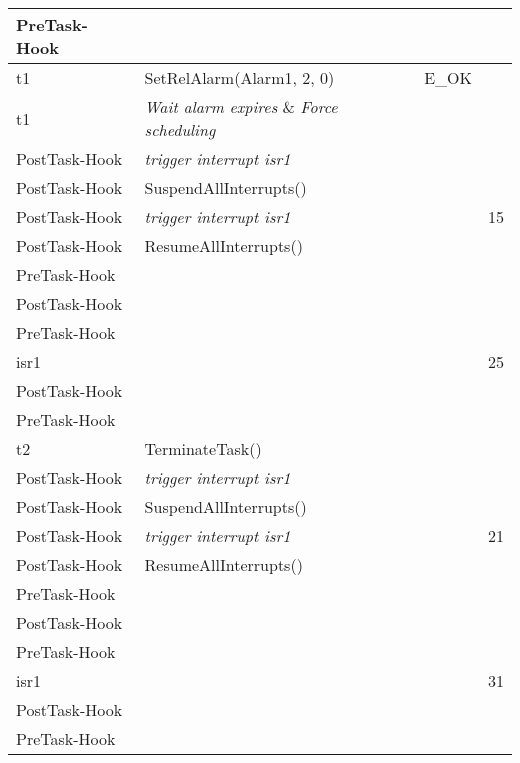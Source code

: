 \documentclass[10pt]{article}
\newlength{\Li}\settowidth{\Li}{Running}
\newlength{\Lii}\setlength{\Lii}{7cm}
\newlength{\Liiii}\setlength{\Liiii}{0.9cm}
\newlength{\Liii}\setlength{\Liii}{\textwidth} \addtolength{\Liii}{-\Li} \addtolength{\Liii}{-\Lii} \addtolength{\Liii}{-\Liiii}
\begin{document}
	\begin{supertabular}{|p{\Li}|p{\Lii}|p{\Liii}|p{\Liiii}|} \hline
	PreTask-Hook	&										&				& \\ \hline
	
	t1			& SetRelAlarm(Alarm1, 2, 0)					& E\_OK			& \\ \hline
	t1			& \textit{Wait alarm expires} \& \textit{Force scheduling} 	& 			&  \\ \hline 
	
	PostTask-Hook	& \textit{trigger interrupt isr1}					&				& \\ \hline
	PostTask-Hook	& SuspendAllInterrupts()						&				& \\ \hline
	PostTask-Hook	& \textit{trigger interrupt isr1}					&				& 15\\ \hline
	PostTask-Hook	& ResumeAllInterrupts()						&				& \\ \hline
	PreTask-Hook	&										&				& \\ \hline
	
	PostTask-Hook	&										&				& \\ \hline
	PreTask-Hook	&										&				& \\ \hline
		
	isr1			& 										& 				& 25\\ \hline
	
	PostTask-Hook	&										&				& \\ \hline
	PreTask-Hook	&										&				& \\ \hline
		
	t2			& TerminateTask()							& 				& \\ \hline
	
	PostTask-Hook	& \textit{trigger interrupt isr1}					&				& \\ \hline
	PostTask-Hook	& SuspendAllInterrupts()						&				& \\ \hline
	PostTask-Hook	& \textit{trigger interrupt isr1}					&				& 21\\ \hline
	PostTask-Hook	& ResumeAllInterrupts()						&				& \\ \hline
	PreTask-Hook	&										&				& \\ \hline
	
	PostTask-Hook	&										&				& \\ \hline
	PreTask-Hook	&										&				& \\ \hline
		
	isr1			& 										& 				& 31\\ \hline
	
	PostTask-Hook	&										&				& \\ \hline
	PreTask-Hook	&										&				& \\ \hline
		

\end{supertabular}
\end{document}
